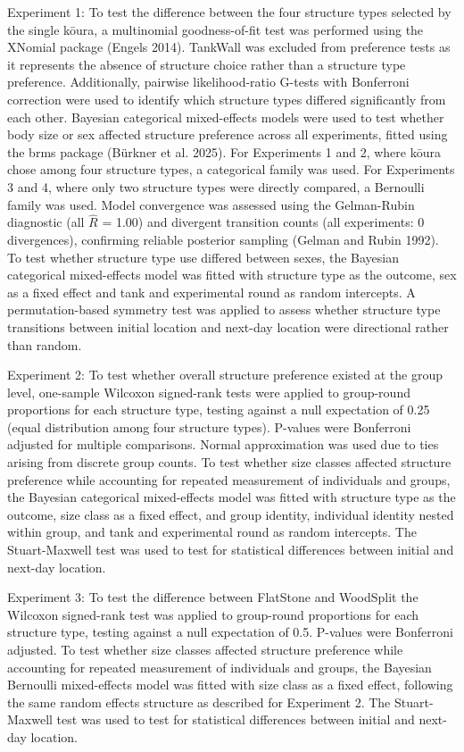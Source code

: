 \documentclass[
  12pt,
  a4paper,
  oneside]{scrbook}
\begin{document}
Experiment 1: To test the difference between the four structure types
selected by the single kōura, a multinomial goodness-of-fit test was
performed using the XNomial package (Engels 2014). TankWall was excluded
from preference tests as it represents the absence of structure choice
rather than a structure type preference. Additionally, pairwise
likelihood-ratio G-tests with Bonferroni correction were used to
identify which structure types differed significantly from each other.
Bayesian categorical mixed-effects models were used to test whether body
size or sex affected structure preference across all experiments, fitted
using the brms package (Bürkner et al. 2025). For Experiments 1 and 2,
where kōura chose among four structure types, a categorical family was
used. For Experiments 3 and 4, where only two structure types were
directly compared, a Bernoulli family was used. Model convergence was
assessed using the Gelman-Rubin diagnostic (all \(\hat{R}\) = 1.00) and
divergent transition counts (all experiments: 0 divergences), confirming
reliable posterior sampling (Gelman and Rubin 1992). To test whether
structure type use differed between sexes, the Bayesian categorical
mixed-effects model was fitted with structure type as the outcome, sex
as a fixed effect and tank and experimental round as random intercepts.
A permutation-based symmetry test was applied to assess whether
structure type transitions between initial location and next-day
location were directional rather than random.

Experiment 2: To test whether overall structure preference existed at
the group level, one-sample Wilcoxon signed-rank tests were applied to
group-round proportions for each structure type, testing against a null
expectation of 0.25 (equal distribution among four structure types).
P-values were Bonferroni adjusted for multiple comparisons. Normal
approximation was used due to ties arising from discrete group counts.
To test whether size classes affected structure preference while
accounting for repeated measurement of individuals and groups, the
Bayesian categorical mixed-effects model was fitted with structure type
as the outcome, size class as a fixed effect, and group identity,
individual identity nested within group, and tank and experimental round
as random intercepts. The Stuart-Maxwell test was used to test for
statistical differences between initial and next-day location.

Experiment 3: To test the difference between FlatStone and WoodSplit the
Wilcoxon signed-rank test was applied to group-round proportions for
each structure type, testing against a null expectation of 0.5. P-values
were Bonferroni adjusted. To test whether size classes affected
structure preference while accounting for repeated measurement of
individuals and groups, the Bayesian Bernoulli mixed-effects model was
fitted with size class as a fixed effect, following the same random
effects structure as described for Experiment 2. The Stuart-Maxwell test
was used to test for statistical differences between initial and
next-day location.
\end{document}
